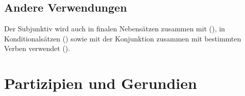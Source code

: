 %
%
%


\subsection{Andere Verwendungen} Der Subjunktiv wird auch in finalen Nebensätzen zusammen mit  (), in Konditionalsätzen () sowie mit der Konjunktion  zusammen mit bestimmten Verben verwendet (). 

\section{Partizipien und Gerundien}

